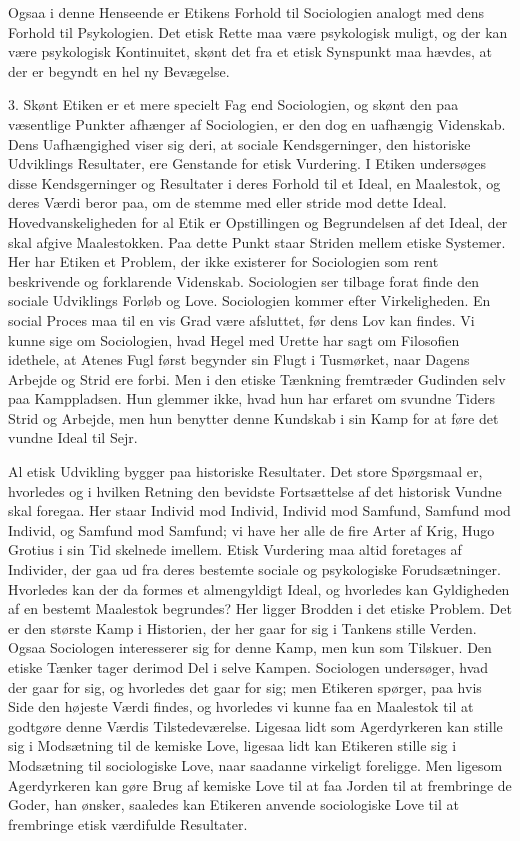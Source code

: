 \documentclass[12pt,a4paper,openany]{book}
\newcommand{\opage}[1]{\marginnote{\footnotesize\textit{[#1]}}}
\begin{document}
Ogsaa i denne Henseende er Etikens Forhold til Sociologien
analogt med dens Forhold til Psykologien. Det etisk
Rette maa være psykologisk muligt, og der kan være psykologisk
Kontinuitet, skønt det fra et etisk Synspunkt maa hævdes,
at der er begyndt en hel ny Bevægelse.

\setcounter{footnote}{0}%
\opage{71}3. Skønt Etiken er et mere specielt Fag end Sociologien,
og skønt den paa væsentlige Punkter afhænger af Sociologien,
er den dog en uafhængig Videnskab. Dens Uafhængighed
viser sig deri, at sociale Kendsgerninger, den historiske Udviklings
Resultater, ere Genstande for etisk Vurdering. I Etiken
undersøges disse Kendsgerninger og Resultater i deres Forhold
til et Ideal, en Maalestok, og deres Værdi beror paa, om de
stemme med eller stride mod dette Ideal. Hovedvanskeligheden
for al Etik er Opstillingen og Begrundelsen af det Ideal,
der skal afgive Maalestokken. Paa dette Punkt staar Striden
mellem etiske Systemer. Her har Etiken et Problem, der ikke
existerer for Sociologien som rent beskrivende og forklarende
Videnskab. Sociologien ser tilbage forat finde den sociale
Udviklings Forløb og Love. Sociologien kommer efter Virkeligheden.
En social Proces maa til en vis Grad være afsluttet,
før dens Lov kan findes. Vi kunne sige om Sociologien, hvad
Hegel med Urette har sagt om Filosofien idethele, at Atenes
Fugl først begynder sin Flugt i Tusmørket, naar Dagens Arbejde
og Strid ere forbi. Men i den etiske Tænkning fremtræder
Gudinden selv paa Kamppladsen. Hun glemmer ikke,
hvad hun har erfaret om svundne Tiders Strid og Arbejde,
men hun benytter denne Kundskab i sin Kamp for at føre det
vundne Ideal til Sejr.

Al etisk Udvikling bygger paa historiske Resultater. Det
store Spørgsmaal er, hvorledes og i hvilken Retning den bevidste
Fortsættelse af det historisk Vundne skal foregaa. Her
staar Individ mod Individ, Individ mod Samfund, Samfund mod
Individ, og Samfund mod Samfund; vi have her alle de fire
Arter af Krig, Hugo Grotius i sin Tid skelnede imellem. Etisk
Vurdering maa altid foretages af Individer, der gaa ud fra deres
bestemte sociale og psykologiske Forudsætninger. Hvorledes
kan der da formes et almengyldigt Ideal, og hvorledes kan
Gyldigheden af en bestemt Maalestok begrundes? Her ligger
Brodden i det etiske Problem. Det er den største Kamp i
Historien, der her gaar for sig i Tankens stille Verden. Ogsaa
Sociologen interesserer sig for denne Kamp, men kun som Tilskuer.
Den etiske Tænker tager derimod Del i selve Kampen.
\setcounter{footnote}{0}%
\opage{72}Sociologen undersøger, hvad der gaar for sig, og hvorledes
det gaar for sig; men Etikeren spørger, paa hvis Side den
højeste Værdi findes, og hvorledes vi kunne faa en Maalestok
til at godtgøre denne Værdis Tilstedeværelse. Ligesaa
lidt som Agerdyrkeren kan stille sig i Modsætning til de
kemiske Love, ligesaa lidt kan Etikeren stille sig i Modsætning
til sociologiske Love, naar saadanne virkeligt foreligge.
Men ligesom Agerdyrkeren kan gøre Brug af kemiske Love
til at faa Jorden til at frembringe de Goder, han ønsker, saaledes
kan Etikeren anvende sociologiske Love til at frembringe
etisk værdifulde Resultater.
\end{document}
